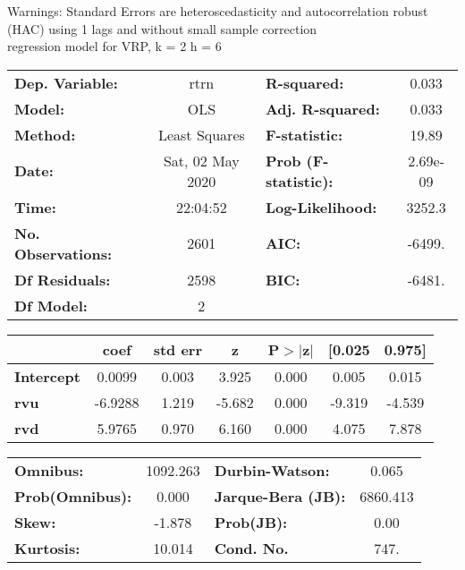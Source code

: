 Warnings: \newline
 [1] Standard Errors are heteroscedasticity and autocorrelation robust (HAC) using 1 lags and without small sample correction\\ 

regression model for VRP, k = 2 h = 6\begin{center}
\begin{tabular}{lclc}
\toprule
\textbf{Dep. Variable:}    &       rtrn       & \textbf{  R-squared:         } &     0.033   \\
\textbf{Model:}            &       OLS        & \textbf{  Adj. R-squared:    } &     0.033   \\
\textbf{Method:}           &  Least Squares   & \textbf{  F-statistic:       } &     19.89   \\
\textbf{Date:}             & Sat, 02 May 2020 & \textbf{  Prob (F-statistic):} &  2.69e-09   \\
\textbf{Time:}             &     22:04:52     & \textbf{  Log-Likelihood:    } &    3252.3   \\
\textbf{No. Observations:} &        2601      & \textbf{  AIC:               } &    -6499.   \\
\textbf{Df Residuals:}     &        2598      & \textbf{  BIC:               } &    -6481.   \\
\textbf{Df Model:}         &           2      & \textbf{                     } &             \\
\bottomrule
\end{tabular}
\begin{tabular}{lcccccc}
                   & \textbf{coef} & \textbf{std err} & \textbf{z} & \textbf{P$> |$z$|$} & \textbf{[0.025} & \textbf{0.975]}  \\
\midrule
\textbf{Intercept} &       0.0099  &        0.003     &     3.925  &         0.000        &        0.005    &        0.015     \\
\textbf{rvu}       &      -6.9288  &        1.219     &    -5.682  &         0.000        &       -9.319    &       -4.539     \\
\textbf{rvd}       &       5.9765  &        0.970     &     6.160  &         0.000        &        4.075    &        7.878     \\
\bottomrule
\end{tabular}
\begin{tabular}{lclc}
\textbf{Omnibus:}       & 1092.263 & \textbf{  Durbin-Watson:     } &    0.065  \\
\textbf{Prob(Omnibus):} &   0.000  & \textbf{  Jarque-Bera (JB):  } & 6860.413  \\
\textbf{Skew:}          &  -1.878  & \textbf{  Prob(JB):          } &     0.00  \\
\textbf{Kurtosis:}      &  10.014  & \textbf{  Cond. No.          } &     747.  \\
\bottomrule
\end{tabular}
\end{center}

